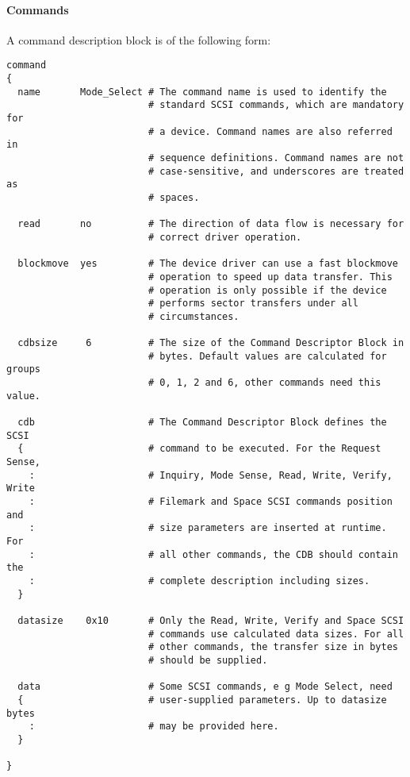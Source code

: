 \paragraph{Commands}
A command description block is of the following form:


\begin{listing}
  \begin{verbatim}
command
{
  name       Mode_Select # The command name is used to identify the
                         # standard SCSI commands, which are mandatory for
                         # a device. Command names are also referred in
                         # sequence definitions. Command names are not
                         # case-sensitive, and underscores are treated as
                         # spaces.

  read       no          # The direction of data flow is necessary for
                         # correct driver operation.

  blockmove  yes         # The device driver can use a fast blockmove
                         # operation to speed up data transfer. This
                         # operation is only possible if the device
                         # performs sector transfers under all
                         # circumstances.

  cdbsize     6          # The size of the Command Descriptor Block in
                         # bytes. Default values are calculated for groups
                         # 0, 1, 2 and 6, other commands need this value.

  cdb                    # The Command Descriptor Block defines the SCSI
  {                      # command to be executed. For the Request Sense,
    :                    # Inquiry, Mode Sense, Read, Write, Verify, Write
    :                    # Filemark and Space SCSI commands position and
    :                    # size parameters are inserted at runtime. For
    :                    # all other commands, the CDB should contain the
    :                    # complete description including sizes.
  }

  datasize    0x10       # Only the Read, Write, Verify and Space SCSI
                         # commands use calculated data sizes. For all
                         # other commands, the transfer size in bytes
                         # should be supplied.

  data                   # Some SCSI commands, e g Mode Select, need
  {                      # user-supplied parameters. Up to datasize bytes
    :                    # may be provided here.
  }

}
  \end{verbatim}
\end{listing}

